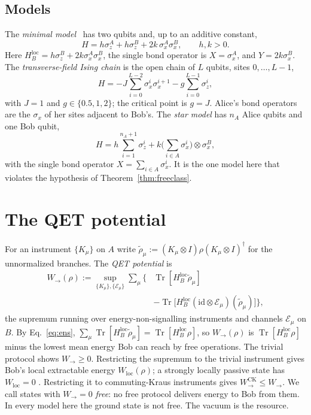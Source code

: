 \documentclass[aps,pra,twocolumn,reprint,superscriptaddress,nofootinbib,floatfix]{revtex4-2}
\theoremstyle{plain}
\theoremstyle{remark}
\newcommand{\Tr}{\operatorname{Tr}}
\newcommand{\id}{\mathrm{id}}
\newcommand{\Wto}{W_{\to}}
\newcommand{\WCK}{W_{\to}^{\mathrm{CK}}}
\newcommand{\Wloc}{W_{\mathrm{loc}}}
\newcommand{\HBl}{H_B^{\mathrm{loc}}}
\newcommand{\E}{\mathcal{E}}
\begin{document}
\subsection{Models}
\label{sec:models}

The \emph{minimal model}~\cite[Sec.~3]{Hotta2011review} has two qubits and, up to an
additive constant,
\begin{equation}
H=h\sigma_z^A+h\sigma_z^B+2k\,\sigma_x^A\sigma_x^B ,\qquad h,k>0 .
\label{eq:minimal}
\end{equation}
Here $\HBl=h\sigma_z^B+2k\sigma_x^A\sigma_x^B$, the single bond operator is
$X=\sigma_x^A$, and $Y=2k\sigma_x^B$. The \emph{transverse-field Ising chain} is the open
chain of $L$ qubits, sites $0,\dots,L-1$,
\begin{equation}
H=-J\sum_{i=0}^{L-2}\sigma_x^i\sigma_x^{i+1}-g\sum_{i=0}^{L-1}\sigma_z^i ,
\label{eq:tfim}
\end{equation}
with $J=1$ and $g\in\{0.5,1,2\}$; the critical point is $g=J$. Alice's bond operators are
the $\sigma_x$ of her sites adjacent to Bob's. The \emph{star model} has $n_A$ Alice qubits
and one Bob qubit,
\begin{equation}
H=h\sum_{i=1}^{n_A+1}\sigma_z^i+k\Big(\sum_{i\in A}\sigma_x^i\Big)\otimes\sigma_x^B ,
\label{eq:star}
\end{equation}
with the single bond operator $X=\sum_{i\in A}\sigma_x^i$. It is the one model here that
violates the hypothesis of Theorem~\ref{thm:freeclass}.

\section{The QET potential}
\label{sec:potential}

For an instrument $\{K_\mu\}$ on $A$ write $\tilde\rho_\mu:=(K_\mu\otimes
I)\rho(K_\mu\otimes I)^\dagger$ for the unnormalized branches. The \emph{QET potential} is
\begin{equation}
\begin{split}
\Wto(\rho):=\sup_{\{K_\mu\},\{\E_\mu\}}\sum_\mu\Big\{&\Tr[\HBl\tilde\rho_\mu]\\
&-\Tr\big[\HBl(\id\otimes\E_\mu)(\tilde\rho_\mu)\big]\Big\} ,
\end{split}
\label{eq:W}
\end{equation}
the supremum running over energy-non-signalling instruments and channels $\E_\mu$ on $B$.
By Eq.~\eqref{eq:ens}, $\sum_\mu\Tr[\HBl\tilde\rho_\mu]=\Tr[\HBl\rho]$, so $\Wto(\rho)$ is
$\Tr[\HBl\rho]$ minus the lowest mean energy Bob can reach by free operations. The trivial
protocol shows $\Wto\ge0$. Restricting the supremum to the trivial instrument gives Bob's
local extractable energy $\Wloc(\rho)$; a strongly locally passive state has $\Wloc=0$
\cite{Frey2014,Alhambra2019}. Restricting it to commuting-Kraus instruments gives $\WCK\le\Wto$.
We call states with $\Wto=0$ \emph{free}: no free protocol delivers energy to Bob from them.
In every model here the ground state is not free. The vacuum is the resource.
\end{document}
